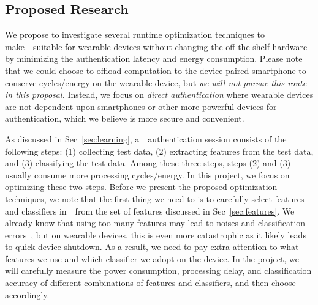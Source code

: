 \subsection{Proposed Research}
We propose to investigate several runtime optimization techniques to make~\systemname~suitable for wearable devices without changing the off-the-shelf hardware by  minimizing the authentication latency and energy consumption. Please note that we could choose to offload computation to the device-paired smartphone to conserve cycles/energy on the wearable device, but \emph{we will not pursue this route in this proposal.} Instead, we focus on \emph{direct authentication} where wearable devices are not dependent upon smartphones or other more powerful devices for authentication, which we believe is more secure and convenient.

As discussed in Sec~\ref{sec:learning}, a~\systemname~authentication session consists of the following steps: (1) collecting test data, (2) extracting features from the test data, and (3) classifying the test data. Among these three steps, steps (2) and (3) usually consume more processing cycles/energy. In this project, we focus on optimizing these two steps. Before we present the proposed optimization techniques, we note that the first thing we need to is to carefully select features and classifiers in~\systemname~from the set of features discussed in Sec~\ref{sec:features}. We already know that using too many features may lead to noises and classification errors~\cite{***}, but on wearable devices, this is even more catastrophic as it likely leads to quick device shutdown. As a result, we need to pay extra attention to what features we use and which classifier we adopt on the device. In the project, we will carefully measure the power consumption, processing delay, and classification accuracy of different combinations of features and classifiers, and then choose accordingly.

